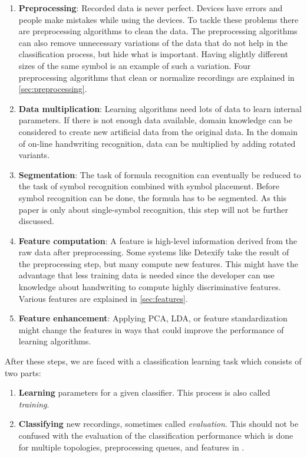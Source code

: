 \documentclass[9pt,technote]{IEEEtran}
\begin{document}
\begin{enumerate}
    \item \textbf{Preprocessing}: Recorded data is never perfect. Devices have
          errors and people make mistakes while using the devices. To tackle
          these problems there are preprocessing algorithms to clean the data.
          The preprocessing algorithms can also remove unnecessary variations
          of the data that do not help in the classification process, but hide
          what is important. Having slightly different sizes of the same symbol
          is an example of such a variation. Four preprocessing algorithms that
          clean or normalize recordings are explained in
          \cref{sec:preprocessing}.
    \item \textbf{Data multiplication}: Learning algorithms need lots of data
          to learn internal parameters. If there is not enough data available,
          domain knowledge can be considered to create new artificial data from
          the original data. In the domain of on-line handwriting recognition,
          data can be multiplied by adding rotated variants.
    \item \textbf{Segmentation}: The task of formula recognition can eventually
          be reduced to the task of symbol recognition combined with symbol
          placement. Before symbol recognition can be done, the formula has
          to be segmented. As this paper is only about single-symbol
          recognition, this step will not be further discussed.
    \item \textbf{Feature computation}: A feature is high-level information
          derived from the raw data after preprocessing. Some systems like
          Detexify take the result of the preprocessing step, but many
          compute new features. This might have the advantage that less
          training data is needed since the developer can use knowledge about
          handwriting to compute highly discriminative features. Various
          features are explained in \cref{sec:features}.
    \item \textbf{Feature enhancement}: Applying PCA, LDA, or
          feature standardization might change the features in ways that could
          improve the performance of learning algorithms.
\end{enumerate}

After these steps, we are faced with a classification learning task which
consists of two parts:
\begin{enumerate}
    \item \textbf{Learning} parameters for a given classifier. This process is
          also called \textit{training}.
    \item \textbf{Classifying} new recordings, sometimes called
          \textit{evaluation}. This should not be confused with the evaluation
          of the classification performance which is done for multiple
          topologies, preprocessing queues, and features in
          .
\end{enumerate}
\end{document}
